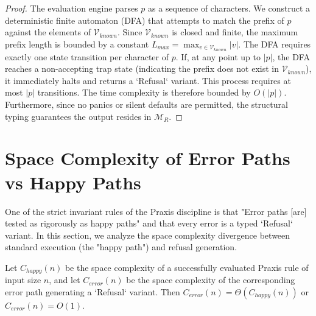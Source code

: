 \begin{proof}
The evaluation engine parses $p$ as a sequence of characters. We construct a deterministic finite automaton (DFA) that attempts to match the prefix of $p$ against the elements of $\mathcal{V}_{known}$. Since $\mathcal{V}_{known}$ is closed and finite, the maximum prefix length is bounded by a constant $L_{max} = \max_{v \in \mathcal{V}_{known}} |v|$.
The DFA requires exactly one state transition per character of $p$. If, at any point up to $|p|$, the DFA reaches a non-accepting trap state (indicating the prefix does not exist in $\mathcal{V}_{known}$), it immediately halts and returns a `Refusal` variant. 
This process requires at most $|p|$ transitions. The time complexity is therefore bounded by $O(|p|)$. Furthermore, since no panics or silent defaults are permitted, the structural typing guarantees the output resides in $\mathcal{M}_R$. 
\end{proof}

\section{Space Complexity of Error Paths vs Happy Paths}

One of the strict invariant rules of the Praxis discipline is that "Error paths [are] tested as rigorously as happy paths" and that every error is a typed `Refusal` variant. In this section, we analyze the space complexity divergence between standard execution (the "happy path") and refusal generation.

\begin{theorem}
\label{thm:space_isomorphism}
Let $C_{happy}(n)$ be the space complexity of a successfully evaluated Praxis rule of input size $n$, and let $C_{error}(n)$ be the space complexity of the corresponding error path generating a `Refusal` variant. Then $C_{error}(n) = \Theta(C_{happy}(n))$ or $C_{error}(n) = O(1)$.
\end{theorem}

